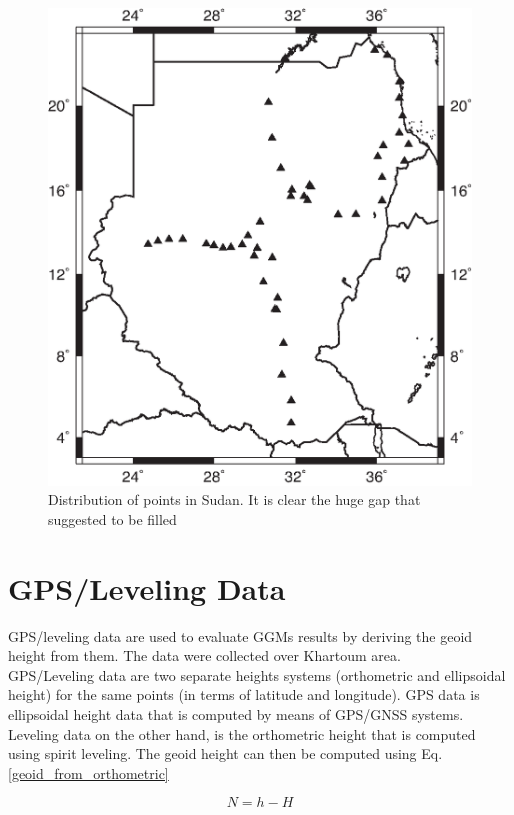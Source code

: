 \begin{figure}[t]
	\caption{Distribution of \citep{osman} points in Sudan. It is clear the huge gap that \citet{osman} suggested to be filled}
	\label{sudan_data}
	\includegraphics{Figures/points_dist.eps}
	\centering
\end{figure}


\section{GPS/Leveling Data}

GPS/leveling data are used to evaluate GGMs results by deriving the geoid height from them. The data were collected over Khartoum area. \\
GPS/Leveling data are two separate heights systems (orthometric and ellipsoidal height) for the same points (in terms of latitude and longitude). GPS data is ellipsoidal height data that is computed by means of GPS/GNSS systems. Leveling data on the other hand, is the orthometric height that is computed using spirit leveling. The geoid height can then be computed using Eq. \eqref{geoid_from_orthometric}

\begin{equation}
\label{eqn:geoid_from_orthometric}
N = h - H
\end{equation}

